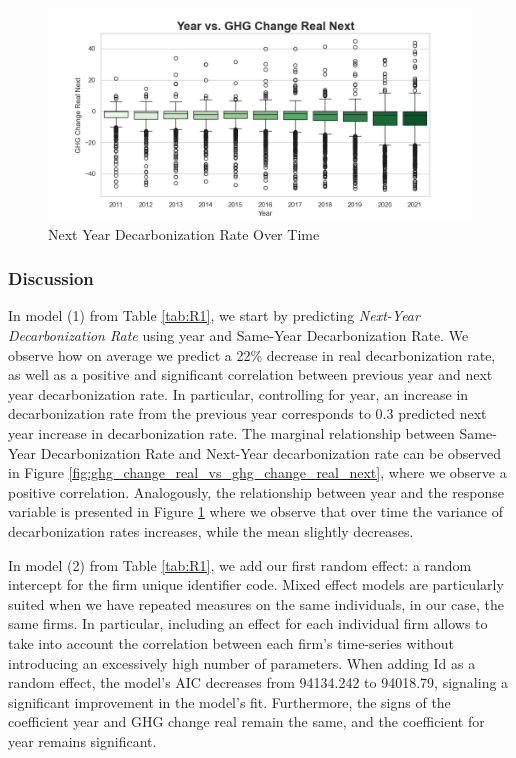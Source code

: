 \begin{figure}[H]
\centering
  \includegraphics[width=\textwidth]{figures/year_vs_ghg_change_real_next.png}
\caption{Next Year Decarbonization Rate Over Time}
\label{fig:ghg_change_real_vs_year}
\end{figure}

    


\subsubsection{Discussion}
In model (1) from Table \ref{tab:R1}, we start by predicting \textit{Next-Year Decarbonization Rate} using year and Same-Year Decarbonization Rate. We observe how on average we predict a 22\% decrease in real decarbonization rate, as well as a positive and significant correlation between previous year and next year decarbonization rate. In particular, controlling for year, an increase in decarbonization rate from the previous year corresponds to 0.3 predicted next year increase in decarbonization rate. The marginal relationship between Same-Year Decarbonization Rate and Next-Year decarbonization rate can be observed in Figure \ref{fig:ghg_change_real_vs_ghg_change_real_next}, where we observe a positive correlation. Analogously, the relationship between year and the response variable is presented in Figure \ref{fig:ghg_change_real_vs_year} where we observe that over time the variance of decarbonization rates increases, while the mean slightly decreases.


In model (2) from Table \ref{tab:R1}, we add our first random effect: a random intercept for the firm unique identifier code. Mixed effect models are particularly suited when we have repeated measures on the same individuals, in our case, the same firms. In particular, including an effect for each individual firm allows to take into account the correlation between each firm's time-series without introducing an excessively high number of parameters. When adding Id as a random effect, the model's AIC decreases from 94134.242 to 94018.79, signaling a significant improvement in the model's fit. Furthermore, the signs of the coefficient year and GHG change real remain the same, and the coefficient for year remains significant. 


